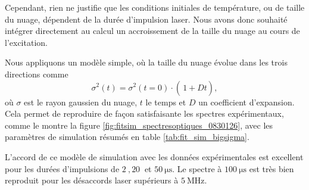 %
%

Cependant, rien ne justifie que les conditions initiales de température, ou de taille du nuage, dépendent de la durée d'impulsion laser.
Nous avons donc souhaité intégrer directement au calcul un accroissement de la taille du nuage au cours de l'excitation.

Nous appliquons un modèle simple, où la taille du nuage évolue dans les trois directions comme
\begin{equation}
\sigma^2(t) = \sigma^2 (t=0) \cdot \left( \frac{}{} \! 1 + Dt \right),
\end{equation}
où $\sigma$ est le rayon gaussien du nuage, $t$ le temps et $D$ un coefficient d'expansion.
Cela permet de reproduire de façon satisfaisante les spectres expérimentaux, comme le montre la figure \eqref{fig:fitsim_spectresoptiques_0830126}, avec les paramètres de simulation résumés en table \eqref{tab:fit_sim_bigsigma}.

L'accord de ce modèle de simulation avec les données expérimentales est excellent pour les durées d'impulsions de $\SI{2}{},\SI{20}{}$ et $\SI{50}{\us}$.
Le spectre à $\SI{100}{\us}$ est très bien reproduit pour les désaccords laser supérieurs à $\SI{5}{\MHz}$.


